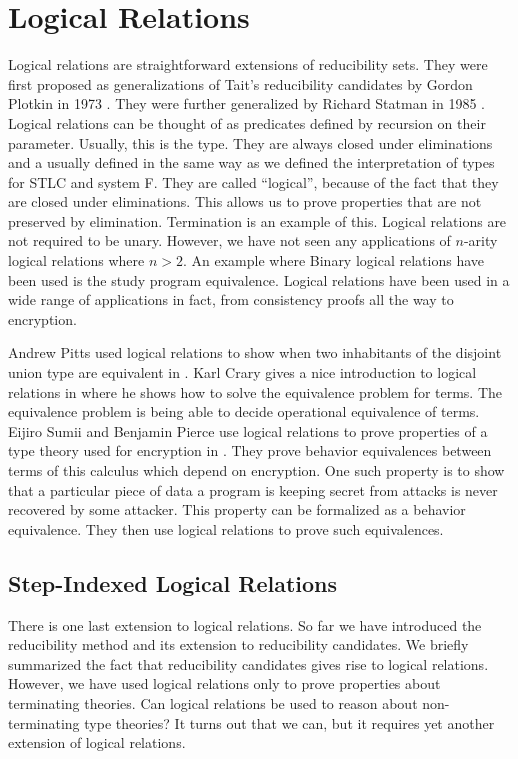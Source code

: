 



\section{Logical Relations}
\label{sec:logical_relations}
Logical relations are straightforward extensions of reducibility sets.
They were first proposed as generalizations of Tait's reducibility
candidates by Gordon Plotkin in 1973 \cite{Plotkin:1973}.  They were
further generalized by Richard Statman in 1985 \cite{Statman:1985}.
Logical relations can be thought of as predicates defined by recursion
on their parameter.  Usually, this is the type.  They are always
closed under eliminations and a usually defined in the same way as we
defined the interpretation of types for STLC and system F.  They are
called ``logical'', because of the fact that they are closed under
eliminations.  This allows us to prove properties that are not
preserved by elimination.  Termination is an example of this.  Logical
relations are not required to be unary.  However, we have not seen any
applications of $n$-arity logical relations where $n > 2$.  An example
where Binary logical relations have been used is the study program
equivalence.  Logical relations have been used in a wide range of
applications in fact, from consistency proofs all the way to
encryption.

Andrew Pitts used logical relations to show when two inhabitants of
the disjoint union type are equivalent in \cite{Pitts:1998}.  Karl
Crary gives a nice introduction to logical relations in
\cite{Pierce:2004} where he shows how to solve the equivalence problem
for terms.  The equivalence problem is being able to decide
operational equivalence of terms.  Eijiro Sumii and Benjamin Pierce
use logical relations to prove properties of a type theory used for
encryption in \cite{Sumii:2003}.  They prove behavior equivalences
between terms of this calculus which depend on encryption.  One such
property is to show that a particular piece of data a program is
keeping secret from attacks is never recovered by some attacker.  This
property can be formalized as a behavior equivalence.  They then use
logical relations to prove such equivalences.

\subsection{Step-Indexed Logical Relations}
\label{sec:step_indexed_logical_relations}
There is one last extension to logical relations.  So far we have
introduced the reducibility method and its extension to reducibility
candidates.  We briefly summarized the fact that reducibility
candidates gives rise to logical relations.  However, we have used
logical relations only to prove properties about terminating theories.
Can logical relations be used to reason about non-terminating type
theories?  It turns out that we can, but it requires yet another
extension of logical relations.

